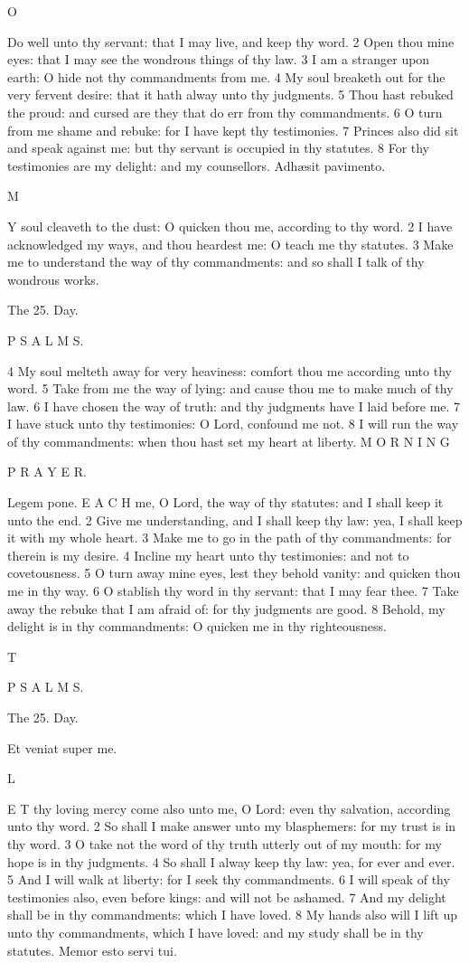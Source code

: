 O

Do well unto thy servant: that I may live, and keep thy word. 2 Open thou mine eyes: that I may see the wondrous things of thy law. 3 I am a stranger upon earth: O hide not thy commandments from me. 4 My soul breaketh out for the very fervent desire: that it hath alway unto thy judgments. 5 Thou hast rebuked the proud: and cursed are they that do err from thy commandments. 6 O turn from me shame and rebuke: for I have kept thy testimonies. 7 Princes also did sit and speak against me: but thy servant is occupied in thy statutes. 8 For thy testimonies are my delight: and my counsellors. Adhæsit pavimento.

M

Y soul cleaveth to the dust: O quicken thou me, according to thy word. 2 I have acknowledged my ways, and thou heardest me: O teach me thy statutes. 3 Make me to understand the way of thy commandments: and so shall I talk of thy wondrous works.

The 25. Day.

P S A L M S.

4 My soul melteth away for very heaviness: comfort thou me according unto thy word. 5 Take from me the way of lying: and cause thou me to make much of thy law. 6 I have chosen the way of truth: and thy judgments have I laid before me. 7 I have stuck unto thy testimonies: O Lord, confound me not. 8 I will run the way of thy commandments: when thou hast set my heart at liberty. M O R N I N G

P R A Y E R.

Legem pone. E A C H me, O Lord, the way of thy statutes: and I shall keep it unto the end. 2 Give me understanding, and I shall keep thy law: yea, I shall keep it with my whole heart. 3 Make me to go in the path of thy commandments: for therein is my desire. 4 Incline my heart unto thy testimonies: and not to covetousness. 5 O turn away mine eyes, lest they behold vanity: and quicken thou me in thy way. 6 O stablish thy word in thy servant: that I may fear thee. 7 Take away the rebuke that I am afraid of: for thy judgments are good. 8 Behold, my delight is in thy commandments: O quicken me in thy righteousness.

T

P S A L M S.

The 25. Day.

Et veniat super me.

L

E T thy loving mercy come also unto me, O Lord: even thy salvation, according unto thy word. 2 So shall I make answer unto my blasphemers: for my trust is in thy word. 3 O take not the word of thy truth utterly out of my mouth: for my hope is in thy judgments. 4 So shall I alway keep thy law: yea, for ever and ever. 5 And I will walk at liberty: for I seek thy commandments. 6 I will speak of thy testimonies also, even before kings: and will not be ashamed. 7 And my delight shall be in thy commandments: which I have loved. 8 My hands also will I lift up unto thy commandments, which I have loved: and my study shall be in thy statutes. Memor esto servi tui.

